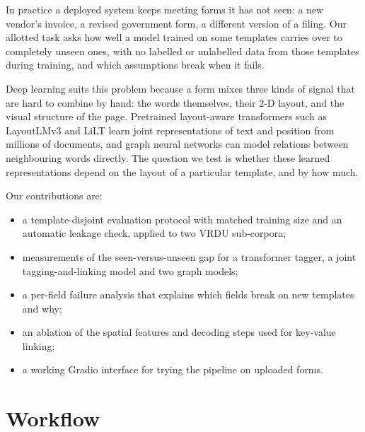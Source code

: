 \documentclass[11pt,a4paper]{article}
\begin{document}
In practice a deployed system keeps meeting forms it has not seen: a new vendor's invoice, a revised government form, a different version of a filing. Our allotted task asks how well a model trained on some templates carries over to completely unseen ones, with no labelled or unlabelled data from those templates during training, and which assumptions break when it fails.

Deep learning suits this problem because a form mixes three kinds of signal that are hard to combine by hand: the words themselves, their 2-D layout, and the visual structure of the page. Pretrained layout-aware transformers such as LayoutLMv3 \cite{layoutlmv3} and LiLT \cite{lilt} learn joint representations of text and position from millions of documents, and graph neural networks \cite{gat} can model relations between neighbouring words directly. The question we test is whether these learned representations depend on the layout of a particular template, and by how much.

Our contributions are:
\begin{itemize}
  \item a template-disjoint evaluation protocol with matched training size and an automatic leakage check, applied to two VRDU sub-corpora;
  \item measurements of the seen-versus-unseen gap for a transformer tagger, a joint tagging-and-linking model and two graph models;
  \item a per-field failure analysis that explains which fields break on new templates and why;
  \item an ablation of the spatial features and decoding steps used for key-value linking;
  \item a working Gradio interface for trying the pipeline on uploaded forms.
\end{itemize}

\section{Workflow}
\end{document}
